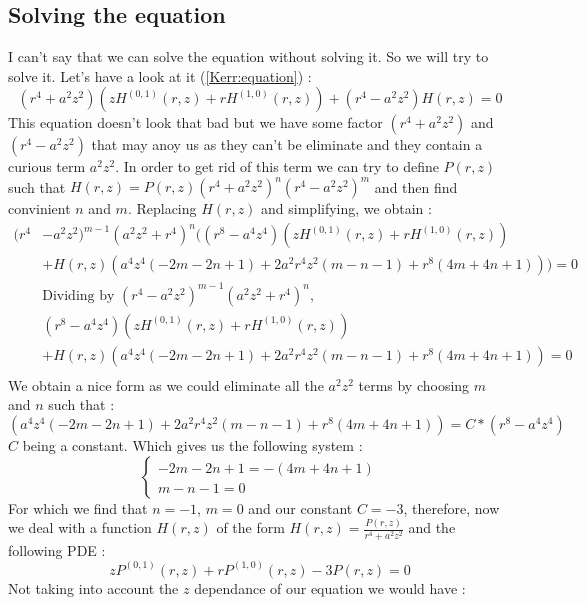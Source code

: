 \documentclass[a4paper,12pt]{article}
\theoremstyle{definition}
\begin{document}
\subsection{Solving the equation}
I can't say that we can solve the equation without solving it.
So we will try to solve it.
Let's have a look at it (\ref{Kerr:equation}) :
\begin{equation}
	(r^4+a^2z^2)(z H^{(0,1)}(r,z)+rH^{(1,0)}(r,z))+(r^4-a^2 z^2) H(r,z)=0
\end{equation}
This equation doesn't look that bad but we have some factor $(r^4+a^2z^2)$ and $(r^4-a^2 z^2)$ that may anoy us as they can't be eliminate and they contain a curious term $a^2z^2$.
In order to get rid of this term we can try to define $P(r,z)$ such that $H(r,z)=P(r,z)(r^4+a^2z^2)^n(r^4-a^2 z^2)^m$ and then find convinient $n$ and $m$.
Replacing $H(r,z)$ and simplifying, we obtain :
\begin{align}
   (r^4&-a^2 z^2)^{m-1} (a^2z^2+r^4)^n((r^8-a^4 z^4)(z H^{(0,1)}(r,z)+r H^{(1,0)}(r,z))\\
   &+H(r,z)(a^4 z^4 (-2 m-2 n+1)+2 a^2 r^4 z^2 (m-n-1)+r^8(4 m+4 n+1)))=0\\
   &\text{Dividing by }(r^4-a^2 z^2)^{m-1} (a^2z^2+r^4)^n,\\
   &(r^8-a^4 z^4)(z H^{(0,1)}(r,z)+r H^{(1,0)}(r,z))\\
   &+H(r,z)(a^4 z^4 (-2 m-2 n+1)+2 a^2 r^4 z^2 (m-n-1)+r^8(4 m+4 n+1))=0\\
\end{align}
We obtain a nice form as we could eliminate all the $a^2z^2$ terms by choosing $m$ and $n$ such that :
\begin{equation}
	(a^4 z^4 (-2 m-2 n+1)+2 a^2 r^4 z^2 (m-n-1)+r^8(4 m+4 n+1))=C*(r^8-a^4 z^4)
\end{equation}
$C$ being a constant. Which gives us the following system :
\begin{equation}
\begin{cases} -2 m-2 n+1=- (4 m+4 n+1)\\ m-n-1=0 \end{cases}
\end{equation}
For which we find that $n=-1$, $m=0$ and our constant $C=-3$, therefore, now we deal with a function $H(r,z)$ of the form $H(r,z)=\frac{P(r,z)}{r^4+a^2z^2}$ and the following PDE :
\begin{equation}\label{P:Eq}
	z P^{(0,1)}(r,z)+r P^{(1,0)}(r,z)-3P(r,z)=0
\end{equation}
Not taking into account the $z$ dependance of our equation we would have :
\end{document}
